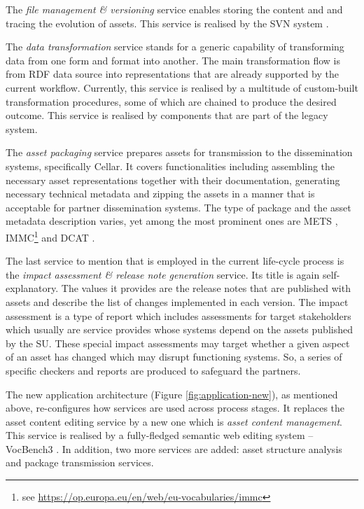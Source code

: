 	The \textit{file management \& versioning} service enables storing the content and and tracing the evolution of assets. This service is realised by the SVN system \cite{svn}.
	
	The \textit{data transformation} service stands for a generic capability of transforming data from one form and format into another. The main transformation flow is from RDF data source into representations that are already supported by the current workflow. Currently, this service is realised by a multitude of custom-built transformation procedures, some of which are chained to produce the desired outcome. This service is realised by components that are part of the legacy system. 
	
	The \textit{asset packaging} service prepares assets for transmission to the dissemination systems, specifically Cellar. It covers functionalities including assembling the necessary asset representations together with their documentation, generating necessary technical metadata and zipping the assets in a manner that is acceptable for partner dissemination systems. The type of package and the asset metadata description varies, yet among the most prominent ones are METS \citep{mets}, IMMC\footnote{see \url{https://op.europa.eu/en/web/eu-vocabularies/immc}} and DCAT \cite{dcat2}. 
	
	The last service to mention that is employed in the current life-cycle process is the \textit{impact assessment \& release note generation} service. Its title is again self-explanatory. The values it provides are the release notes that are published with assets and describe the list of changes implemented in each version. The impact assessment is a type of report which includes assessments for target stakeholders which usually are service provides whose systems depend on the assets published by the SU. These special impact assessments may target whether a given aspect of an asset has changed which may disrupt functioning systems. So, a series of specific checkers and reports are produced to safeguard the partners. 
	
	The new application architecture (Figure \ref{fig:application-new}), as mentioned above, re-configures how services are used across process stages. It replaces the asset content editing service by a new one which is \textit{asset content management}. This service is realised by a fully-fledged semantic web editing system -- VocBench3 \citep{stellatovocbench}. In addition, two more services are added: asset structure analysis and package transmission services.
	
